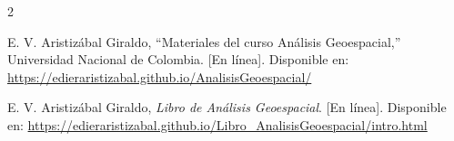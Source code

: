 \documentclass[conference]{IEEEtran}
\begin{document}
\begin{thebibliography}{2}

E. V. Aristizábal Giraldo, ``Materiales del curso Análisis Geoespacial,'' Universidad Nacional de Colombia. [En línea]. Disponible en:
\url{https://edieraristizabal.github.io/AnalisisGeoespacial/}

E. V. Aristizábal Giraldo, \emph{Libro de Análisis Geoespacial}. [En línea]. Disponible en:
\url{https://edieraristizabal.github.io/Libro_AnalisisGeoespacial/intro.html}

\end{thebibliography}
\end{document}
